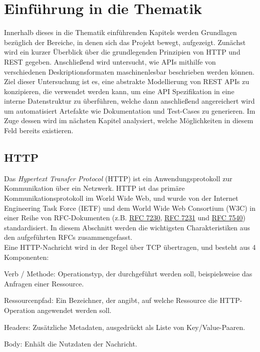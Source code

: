 
\section{Einführung in die Thematik}

Innerhalb dieses in die Thematik einführenden Kapitels werden Grundlagen bezüglich der Bereiche, in denen sich das Projekt bewegt, aufgezeigt. Zunächst wird ein kurzer Überblick über die grundlegenden Prinzipien von HTTP und REST gegeben. Anschließend wird untersucht, wie APIs mithilfe von verschiedenen Deskriptionsformaten maschinenlesbar beschrieben werden können. Ziel dieser Untersuchung ist es, eine abstrakte Modellierung von REST APIs zu konzipieren, die verwendet werden kann, um eine API Spezifikation in eine interne Datenstruktur zu überführen, welche dann anschließend angereichert wird um automatisiert Artefakte wie Dokumentation und Test-Cases zu generieren. Im Zuge dessen wird im nächsten Kapitel analysiert, welche Möglichkeiten in diesem Feld bereits existieren.

\subsection{HTTP}

Das \emph{Hypertext Transfer Protocol} (HTTP) ist ein Anwendungsprotokoll zur Kommunikation über ein Netzwerk. HTTP ist das primäre Kommunikationsprotokoll im World Wide Web, und wurde von der Internet Engineering Task Force (IETF) und dem World Wide Web Consortium (W3C) in einer Reihe von RFC-Dokumenten (z.B. \href{https://tools.ietf.org/html/rfc7230}{RFC 7230}, \href{https://tools.ietf.org/html/rfc7231}{RFC 7231} und \href{https://tools.ietf.org/html/rfc7540}{RFC 7540}) standardisiert. In diesem Abschnitt werden die wichtigsten Charakteristiken aus den aufgeführten RFCs zusammengefasst. \\

Eine HTTP-Nachricht wird in der Regel über TCP übertragen, und besteht aus 4 Komponenten:

\begin{description}
	\item Verb / Methode: Operationstyp, der durchgeführt werden soll, beispielsweise das Anfragen einer Ressource.
    \item Ressourcenpfad: Ein Bezeichner, der angibt, auf welche Ressource die HTTP-Operation angewendet werden soll.
    \item Headers: Zusätzliche Metadaten, ausgedrückt als Liste von Key/Value-Paaren.
    \item Body: Enhält die Nutzdaten der Nachricht.
\end{description}

